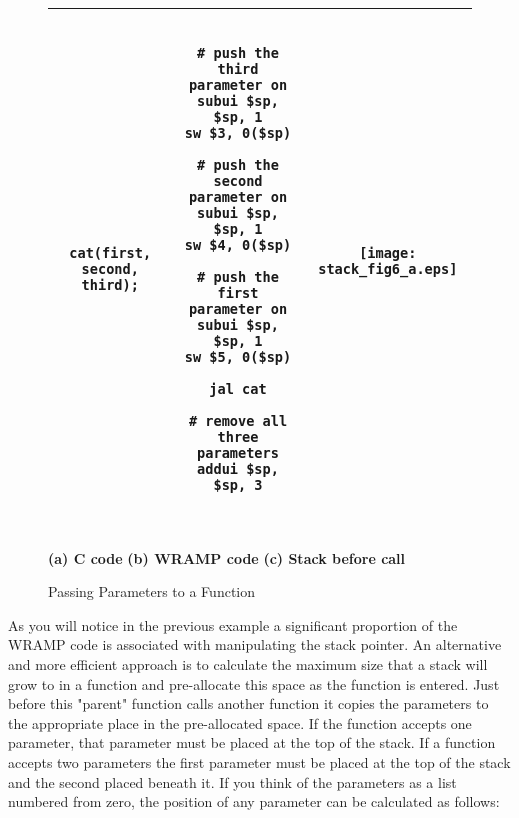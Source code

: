%
%
\begin{figure}[!hbtp]
\begin{center}
\begin{footnotesize}
\begin{tabular}{|c|c|c|}
\hline
\begin{minipage}[t]{4.8cm}
\begin{verbatim}

cat(first, second, third);

\end{verbatim}
\end{minipage}
&
\begin{minipage}[c]{5.5cm}
\begin{verbatim}

# push the third parameter on
subui $sp, $sp, 1
sw $3, 0($sp)

# push the second parameter on
subui $sp, $sp, 1
sw $4, 0($sp)

# push the first parameter on
subui $sp, $sp, 1
sw $5, 0($sp)

jal cat

# remove all three parameters
addui $sp, $sp, 3

\end{verbatim}
\end{minipage}
&
\begin{minipage}{4.2cm}
\begin{center}
\texttt{[image: stack\_fig6\_a.eps]}
\end{center}
\end{minipage}\\
\hline
\end{tabular}
\\
\textbf{(a) C code}
\hspace{3cm}
\textbf{(b) WRAMP code}
\hspace{3cm}
\textbf{(c) Stack before call}\\

\caption{Passing Parameters to a Function}
\label{fig:parampassing}
\end{footnotesize}
\end{center}
\end{figure}

As you will notice in the previous example a significant proportion of
the WRAMP code is associated with manipulating the stack pointer. An
alternative and more efficient approach is to calculate the maximum
size that a stack will grow to in a function and pre-allocate this
space as the function is entered.  Just before this "parent" function
calls another function it copies the parameters to the appropriate
place in the pre-allocated space.  If the function accepts one
parameter, that parameter must be placed at the top of the stack. If a
function accepts two parameters the first parameter must be placed at
the top of the stack and the second placed beneath it.  If you think
of the parameters as a list numbered from zero, the position of any
parameter can be calculated as follows:

